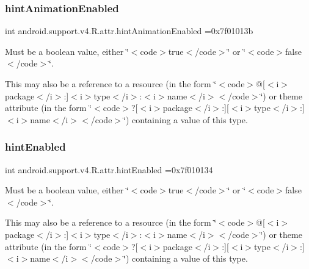 \subsubsection{\texorpdfstring{hint\+Animation\+Enabled}{hintAnimationEnabled}}
{\footnotesize\ttfamily int android.\+support.\+v4.\+R.\+attr.\+hint\+Animation\+Enabled =0x7f01013b\hspace{0.3cm}{\ttfamily [static]}}

Must be a boolean value, either \char`\"{}$<$code$>$true$<$/code$>$\char`\"{} or \char`\"{}$<$code$>$false$<$/code$>$\char`\"{}. 

This may also be a reference to a resource (in the form \char`\"{}$<$code$>$@\mbox{[}$<$i$>$package$<$/i$>$\+:\mbox{]}$<$i$>$type$<$/i$>$\+:$<$i$>$name$<$/i$>$$<$/code$>$\char`\"{}) or theme attribute (in the form \char`\"{}$<$code$>$?\mbox{[}$<$i$>$package$<$/i$>$\+:\mbox{]}\mbox{[}$<$i$>$type$<$/i$>$\+:\mbox{]}$<$i$>$name$<$/i$>$$<$/code$>$\char`\"{}) containing a value of this type. \mbox{\label{classandroid_1_1support_1_1v4_1_1R_1_1attr_a5f4a8cb83603d7a45db4b5284ebe1a41}} 
\subsubsection{\texorpdfstring{hint\+Enabled}{hintEnabled}}
{\footnotesize\ttfamily int android.\+support.\+v4.\+R.\+attr.\+hint\+Enabled =0x7f010134\hspace{0.3cm}{\ttfamily [static]}}

Must be a boolean value, either \char`\"{}$<$code$>$true$<$/code$>$\char`\"{} or \char`\"{}$<$code$>$false$<$/code$>$\char`\"{}. 

This may also be a reference to a resource (in the form \char`\"{}$<$code$>$@\mbox{[}$<$i$>$package$<$/i$>$\+:\mbox{]}$<$i$>$type$<$/i$>$\+:$<$i$>$name$<$/i$>$$<$/code$>$\char`\"{}) or theme attribute (in the form \char`\"{}$<$code$>$?\mbox{[}$<$i$>$package$<$/i$>$\+:\mbox{]}\mbox{[}$<$i$>$type$<$/i$>$\+:\mbox{]}$<$i$>$name$<$/i$>$$<$/code$>$\char`\"{}) containing a value of this type. \mbox{\label{classandroid_1_1support_1_1v4_1_1R_1_1attr_a858dc23526090905ecc8c3669886a11e}} 
